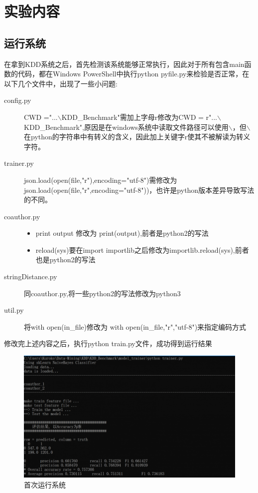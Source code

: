 \documentclass{mcmthesis}
\begin{document}
\section{实验内容}
	\subsection{运行系统}
	\par 在拿到KDD系统之后，首先检测该系统能够正常执行，因此对于所有包含main函数的代码，都在Windows PowerShell中执行python pyfile.py来检验是否正常，在以下几个文件中，出现了一些小问题:
	\begin{description}
		\item [\qquad \quad config.py] CWD ="...$\backslash$KDD\_Benchmark"需加上字母r修改为CWD = r"...$\backslash$KDD\_Benchmark",原因是在windows系统中读取文件路径可以使用$\backslash$，但$\backslash$在python的字符串中有转义的含义，因此加上关键字r使其不被解读为转义字符。
		\item [\qquad \quad trainer.py] json.load(open(file,"r"),encoding="utf-8")需修改为json.load(open(file,"r",encoding="utf-8"))，也许是python版本差异导致写法的不同。
		\item [\qquad \quad coauthor.py] \hspace*{\fill}
			\begin{itemize}
				\item print output 修改为 print(output),前者是python2的写法
				\item reload(sys)要在import importlib之后修改为importlib.reload(sys),前者也是python2的写法
			\end{itemize}
		\item [\qquad \quad stringDistance.py] 同coauthor.py,将一些python2的写法修改为python3
		\item [\qquad \quad util.py] 将with open(in\_file)修改为 with open(in\_file,"r","utf-8")来指定编码方式
	\end{description}
	
	\par 修改完上述内容之后，执行python train.py文件，成功得到运行结果

	\begin{figure}[h]
		\centering
		\includegraphics[width=0.8\linewidth]{p1.png}
		\caption{首次运行系统}
		\label{fig:p1}
	\end{figure}
\end{document}
